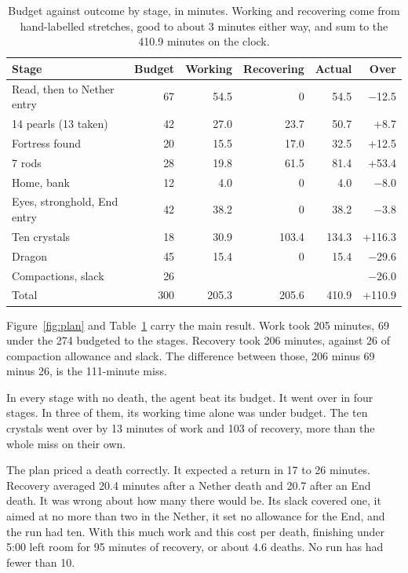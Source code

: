 \documentclass[11pt,a4paper]{article}
\begin{document}
\begin{table}[t]
  \caption{Budget against outcome by stage, in minutes. Working and recovering come from hand-labelled stretches, good to about 3 minutes either way, and sum to the 410.9 minutes on the clock.}
  \label{tab:budget}
  \small
  \begin{tabularx}{\textwidth}{@{}Xrrrrr@{}}
    \toprule
    \textbf{Stage} & \textbf{Budget} & \textbf{Working} & \textbf{Recovering} & \textbf{Actual} & \textbf{Over} \\
    \midrule
    Read, then to Nether entry & 67 & 54.5 & 0 & 54.5 & $-$12.5 \\
    14 pearls (13 taken) & 42 & 27.0 & 23.7 & 50.7 & +8.7 \\
    Fortress found & 20 & 15.5 & 17.0 & 32.5 & +12.5 \\
    7 rods & 28 & 19.8 & 61.5 & 81.4 & +53.4 \\
    Home, bank & 12 & 4.0 & 0 & 4.0 & $-$8.0 \\
    Eyes, stronghold, End entry & 42 & 38.2 & 0 & 38.2 & $-$3.8 \\
    Ten crystals & 18 & 30.9 & 103.4 & 134.3 & +116.3 \\
    Dragon & 45 & 15.4 & 0 & 15.4 & $-$29.6 \\
    Compactions, slack & 26 & & & & $-$26.0 \\
    \midrule
    Total & 300 & 205.3 & 205.6 & 410.9 & +110.9 \\
    \bottomrule
  \end{tabularx}
\end{table}

Figure~\ref{fig:plan} and Table~\ref{tab:budget} carry the main result. Work took 205 minutes, 69 under the 274 budgeted to the stages. Recovery took 206 minutes, against 26 of compaction allowance and slack. The difference between those, 206 minus 69 minus 26, is the 111-minute miss.

In every stage with no death, the agent beat its budget. It went over in four stages. In three of them, its working time alone was under budget. The ten crystals went over by 13 minutes of work and 103 of recovery, more than the whole miss on their own.

The plan priced a death correctly. It expected a return in 17 to 26 minutes. Recovery averaged 20.4 minutes after a Nether death and 20.7 after an End death. It was wrong about how many there would be. Its slack covered one, it aimed at no more than two in the Nether, it set no allowance for the End, and the run had ten. With this much work and this cost per death, finishing under 5:00 left room for 95 minutes of recovery, or about 4.6 deaths. No run has had fewer than 10.
\end{document}
